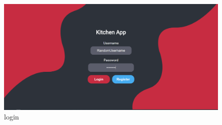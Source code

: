 \documentclass[a4paper]{report}
\begin{document}
\begin{figure}[H]
    \centering 
    \includegraphics[width=\textwidth]{images/login.png}  
    \caption{login}
    \label{fig:login}
\end{figure}
\end{document}
